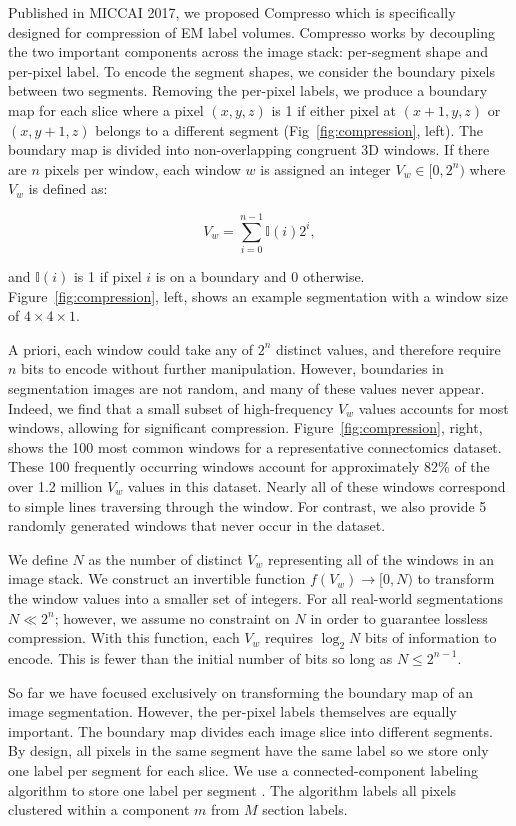 Published in MICCAI 2017, we proposed Compresso which is specifically designed for compression of EM label volumes.
Compresso works by decoupling the two important components across the image stack: per-segment shape and per-pixel label.
To encode the segment shapes, we consider the boundary pixels between two segments. 
Removing the per-pixel labels, we produce a boundary map for each slice where a pixel $(x, y, z)$ is 1 if either pixel at $(x + 1, y, z)$ or $(x, y + 1, z)$ belongs to a different segment (Fig~\ref{fig:compression}, left). 
The boundary map is divided into non-overlapping congruent 3D windows. If there are $n$ pixels per window, each window $w$ is assigned an integer $V_w \in [0, 2^n)$ where $V_w$ is defined as:

\begin{equation}
V_w = \sum_{i = 0}^{n - 1} \mathbb{I}(i) 2^i,
\end{equation}

\noindent
and $\mathbb{I}(i)$ is 1 if pixel $i$ is on a boundary and 0 otherwise. 
Figure~\ref{fig:compression}, left, shows an example segmentation with a window size of $4 \times 4 \times 1$.

A priori, each window could take any of $2^n$ distinct values, and therefore require $n$ bits to encode without further manipulation. 
However, boundaries in segmentation images are not random, and many of these values never appear. 
Indeed, we find that a small subset of high-frequency $V_w$ values accounts for most windows, allowing for significant compression. 
Figure~\ref{fig:compression}, right, shows the 100 most common windows for a representative connectomics dataset. 
These 100 frequently occurring windows account for approximately 82\% of the over 1.2 million $V_w$ values in this dataset.
Nearly all of these windows correspond to simple lines traversing through the window. 
For contrast, we also provide 5 randomly generated windows that never occur in the dataset.


We define $N$ as the number of distinct $V_w$ representing all of the windows in an image stack. 
We construct an invertible function $f(V_w) \to [0, N)$ to transform the window values into a smaller set of integers. 
For all real-world segmentations $N \ll 2^n$; however, we assume no constraint on $N$ in order to guarantee lossless compression. 
With this function, each $V_w$ requires $\log_2{N}$ bits of information to encode. 
This is fewer than the initial number of bits so long as $N \leq 2^{n - 1}$.  

So far we have focused exclusively on transforming the boundary map of an image segmentation. 
However, the per-pixel labels themselves are equally important. 
The boundary map divides each image slice into different segments. 
By design, all pixels in the same segment have the same label so we store only one label per segment for each slice. 
We use a connected-component labeling algorithm to store one label per segment \cite{he2009fast}. 
The algorithm labels all pixels clustered within a component $m$ from $M$ section labels.

